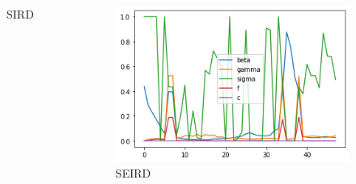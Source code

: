 \documentclass[aspectratio=43]{beamer}
\begin{document}
\begin{frame}
\begin{columns}
\begin{figure}
					\caption{SIRD}
				\end{figure}
					\begin{figure}
						\includegraphics[width=\textwidth]{img/seird_det_1_7.png}
						\caption{SEIRD}
					\end{figure}
	\end{columns}
\end{frame}
\end{document}

